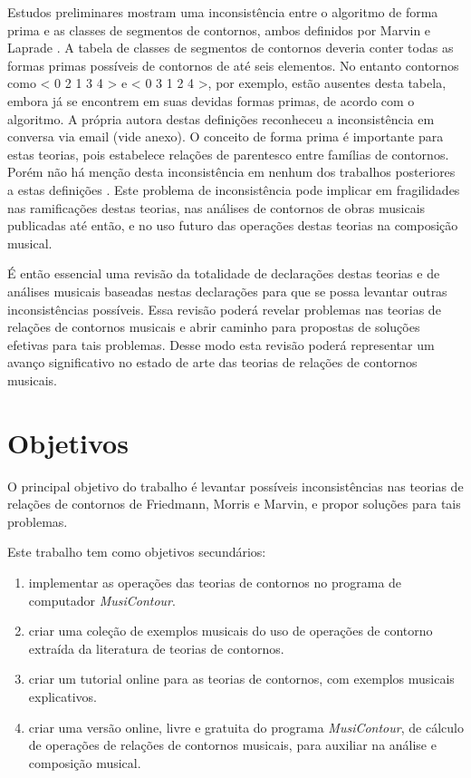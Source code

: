 \documentclass[12pt]{article}
\newcommand{\eng}[1]{\textit{#1}}
\begin{document}
Estudos preliminares mostram uma inconsistência entre o algoritmo de
forma prima e as classes de segmentos de contornos, ambos definidos
por Marvin e Laprade \cite{marvin.ea87:relating}. A tabela de classes
de segmentos de contornos deveria conter todas as formas primas
possíveis de contornos de até seis elementos. No entanto contornos
como < 0 2 1 3 4 > e < 0 3 1 2 4 >, por exemplo, estão ausentes desta
tabela, embora já se encontrem em suas devidas formas primas, de
acordo com o algoritmo. A própria autora destas definições reconheceu
a inconsistência em conversa via email (vide anexo). O conceito de
forma prima é importante para estas teorias, pois estabelece relações
de parentesco entre famílias de contornos. Porém não há menção desta
inconsistência em nenhum dos trabalhos posteriores a estas definições
\cite{polansky.ea92:possible,clifford95:contour,quinn97:fuzzy,beard03:contour,bor09:contour,schultz08:melodic,schultz09:diachronic}. Este
problema de inconsistência pode implicar em fragilidades nas
ramificações destas teorias, nas análises de contornos de obras
musicais publicadas até então, e no uso futuro das operações destas
teorias na composição musical.

É então essencial uma revisão da totalidade de declarações destas
teorias e de análises musicais baseadas nestas declarações para que se
possa levantar outras inconsistências possíveis. Essa revisão poderá
revelar problemas nas teorias de relações de contornos musicais e
abrir caminho para propostas de soluções efetivas para tais
problemas. Desse modo esta revisão poderá representar um avanço
significativo no estado de arte das teorias de relações de contornos
musicais.

\section{Objetivos}
\label{sec:objetivos}

O principal objetivo do trabalho é levantar possíveis inconsistências
nas teorias de relações de contornos de Friedmann, Morris e Marvin, e
propor soluções para tais problemas.

Este trabalho tem como objetivos secundários:

\begin{enumerate}
\item implementar as operações das teorias de contornos no programa de
  computador \eng{MusiContour}.
\item criar uma coleção de exemplos musicais do uso de operações de
  contorno extraída da literatura de teorias de contornos.
\item criar um tutorial online para as teorias de contornos, com
  exemplos musicais explicativos.
\item criar uma versão online, livre e gratuita do programa
  \eng{MusiContour}, de cálculo de operações de relações de contornos
  musicais, para auxiliar na análise e composição musical.
\end{enumerate}
\end{document}
